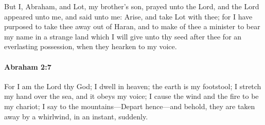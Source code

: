 			But I, Abraham, and Lot, my brother's son, prayed unto the Lord, and the Lord appeared unto me, and said unto me: Arise, and take Lot with thee; for I have purposed to take thee away out of Haran, and to make of thee a minister to bear my name in a strange land which I will give unto thy seed after thee for an everlasting possession, when they hearken to my voice.


		\paragraph{Abraham 2:7} %
			\label{ABRAHAM-2-7}

			For I am the Lord thy God; I dwell in heaven; the earth is my footstool; I stretch my hand over the sea, and it obeys my voice; I cause the wind and the fire to be my chariot; I say to the mountains—Depart hence—and behold, they are taken away by a whirlwind, in an instant, suddenly.


